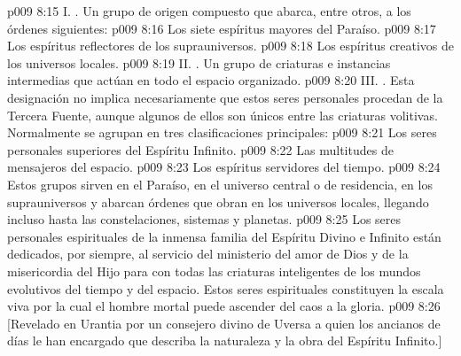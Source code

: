 \vs p009 8:15 \pc I. . Un grupo de origen compuesto que abarca, entre otros, a los órdenes siguientes:
\vs p009 8:16 Los siete espíritus mayores del Paraíso.
\vs p009 8:17 Los espíritus reflectores de los suprauniversos.
\vs p009 8:18 Los espíritus creativos de los universos locales.
\vs p009 8:19 \pc II. . Un grupo de criaturas e instancias intermedias que actúan en todo el espacio organizado.
\vs p009 8:20 \pc III. . Esta designación no implica necesariamente que estos seres personales procedan de la Tercera Fuente, aunque algunos de ellos son únicos entre las criaturas volitivas. Normalmente se agrupan en tres clasificaciones principales:
\vs p009 8:21 Los seres personales superiores del Espíritu Infinito.
\vs p009 8:22 Las multitudes de mensajeros del espacio.
\vs p009 8:23 Los espíritus servidores del tiempo.
\vs p009 8:24 Estos grupos sirven en el Paraíso, en el universo central o de residencia, en los suprauniversos y abarcan órdenes que obran en los universos locales, llegando incluso hasta las constelaciones, sistemas y planetas.
\vs p009 8:25 Los seres personales espirituales de la inmensa familia del Espíritu Divino e Infinito están dedicados, por siempre, al servicio del ministerio del amor de Dios y de la misericordia del Hijo para con todas las criaturas inteligentes de los mundos evolutivos del tiempo y del espacio. Estos seres espirituales constituyen la escala viva por la cual el hombre mortal puede ascender del caos a la gloria.
\vsetoff
\vs p009 8:26 [Revelado en Urantia por un consejero divino de Uversa a quien los ancianos de días le han encargado que describa la naturaleza y la obra del Espíritu Infinito.]
